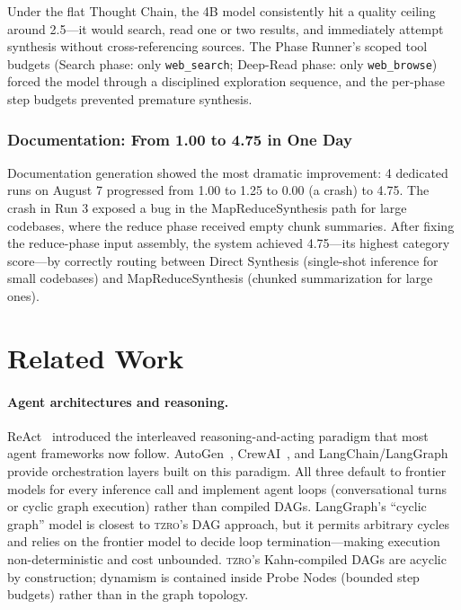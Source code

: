 \documentclass{article}
\begin{document}
Under the flat Thought Chain, the 4B model consistently hit a quality ceiling around 2.5---it would search, read one or two results, and immediately attempt synthesis without cross-referencing sources.
The Phase Runner's scoped tool budgets (Search phase: only \texttt{web\_search}; Deep-Read phase: only \texttt{web\_browse}) forced the model through a disciplined exploration sequence, and the per-phase step budgets prevented premature synthesis.

\subsubsection{Documentation: From 1.00 to 4.75 in One Day}

Documentation generation showed the most dramatic improvement: 4 dedicated runs on August 7 progressed from 1.00 to 1.25 to 0.00 (a crash) to 4.75.
The crash in Run 3 exposed a bug in the MapReduceSynthesis path for large codebases, where the reduce phase received empty chunk summaries.
After fixing the reduce-phase input assembly, the system achieved 4.75---its highest category score---by correctly routing between Direct Synthesis (single-shot inference for small codebases) and MapReduceSynthesis (chunked summarization for large ones).


\section{Related Work}
\label{sec:related_work}

\paragraph{Agent architectures and reasoning.}
ReAct~\cite{react2023} introduced the interleaved reasoning-and-acting paradigm that most agent frameworks now follow.
AutoGen~\cite{autogen2023}, CrewAI~\cite{crewai2024}, and LangChain/LangGraph~\cite{langchain2023} provide orchestration layers built on this paradigm.
All three default to frontier models for every inference call and implement agent loops (conversational turns or cyclic graph execution) rather than compiled DAGs.
LangGraph's ``cyclic graph'' model is closest to \textsc{tzro}'s DAG approach, but it permits arbitrary cycles and relies on the frontier model to decide loop termination---making execution non-deterministic and cost unbounded.
\textsc{tzro}'s Kahn-compiled DAGs are acyclic by construction; dynamism is contained inside Probe Nodes (bounded step budgets) rather than in the graph topology.
\end{document}

